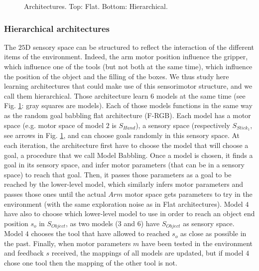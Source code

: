 \documentclass[10pt,letterpaper]{article}
\begin{document}
			\begin{figure}[t]
				\center
				
				\vspace{-0.25cm}
				
				\vspace{-0.5cm}
				\caption{Architectures. Top: Flat. Bottom: Hierarchical.}
				\label{Architectures}					
			\end{figure}
				
		
		\subsubsection{Hierarchical architectures}
			
			The $25$D sensory space can be structured to reflect the interaction of the different items of the environment.
			Indeed, the arm motor position influence the gripper, which influence one of the tools (but not both at the same time), which influence the position of the object and the filling of the boxes.
			We thus study here learning architectures that could make use of this sensorimotor structure, and we call them hierarchical.
			Those architecture learn $6$ models at the same time (see Fig. \ref{Architectures}: gray squares are models). 
			Each of those models functions in the same way as the random goal babbling flat architecture (F-RGB). 
			Each model has a motor space (e.g. motor space of model $2$ is $S_{Hand}$), a sensory space (respectively $S_{Stick_1}$, see arrows in Fig. \ref{Architectures}, and can choose goals randomly in this sensory space.
			At each iteration, the architecture first have to choose the model that will choose a goal, a procedure that we call Model Babbling.
			Once a model is chosen, it finds a goal in its sensory space, and infer motor parameters (that can be in a sensory space) to reach that goal.
			Then, it passes those parameters as a goal to be reached by the lower-level model, 
			which similarly infers motor parameters and passes those ones until the actual $Arm$ motor space gets parameters to try in the environment (with the same exploration noise as in Flat architectures).
			Model $4$ have also to choose which lower-level model to use in order to reach an object end position $s_o$ in $S_{Object}$, as two models ($3$ and $6$) have $S_{Object}$ as sensory space. 
			Model $4$ chooses the tool that have allowed to reached $s_o$ as close as possible in the past.
			Finally, when motor parameters $m$ have been tested in the environment and feedback $s$ received, the mappings of all models are updated, but if model $4$ chose one tool then the mapping of the other tool is not.
			
\end{document}

